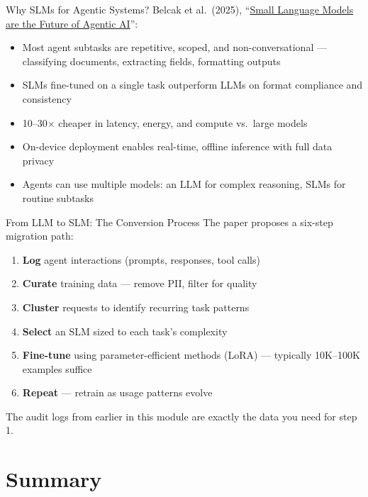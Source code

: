 \documentclass[aspectratio=169]{beamer}
\begin{document}
\begin{frame}{Why SLMs for Agentic Systems?}
Belcak et al.\ (2025), ``\href{https://arxiv.org/abs/2506.02153}{Small Language Models are the Future of Agentic AI}'':
\vspace{0.3cm}
\begin{itemize}
  \item Most agent subtasks are \alert{repetitive, scoped, and non-conversational} --- classifying documents, extracting fields, formatting outputs
  \item SLMs fine-tuned on a single task outperform LLMs on format compliance and consistency
  \item 10--30$\times$ cheaper in latency, energy, and compute vs.\ large models
  \item On-device deployment enables real-time, offline inference with full data privacy
  \item Agents can use \alert{multiple models}: an LLM for complex reasoning, SLMs for routine subtasks
\end{itemize}
\end{frame}

\begin{frame}{From LLM to SLM: The Conversion Process}
The paper proposes a six-step migration path:
\vspace{0.3cm}
\begin{enumerate}
  \item \textbf{Log} agent interactions (prompts, responses, tool calls)
  \item \textbf{Curate} training data --- remove PII, filter for quality
  \item \textbf{Cluster} requests to identify recurring task patterns
  \item \textbf{Select} an SLM sized to each task's complexity
  \item \textbf{Fine-tune} using parameter-efficient methods (LoRA) --- typically 10K--100K examples suffice
  \item \textbf{Repeat} --- retrain as usage patterns evolve
\end{enumerate}
\vspace{0.3cm}
\alert{The audit logs from earlier in this module are exactly the data you need for step 1.}
\end{frame}

\section{Summary}
\end{document}

